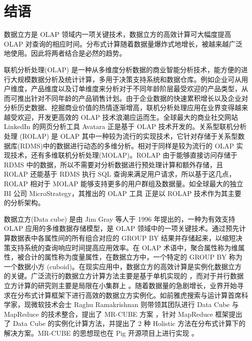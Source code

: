 
\chapter{结语}

数据立方是 OLAP 领域内一项关键技术，数据立方的高效计算可大幅度提高 OLAP 对查询的相应时间。分布式计算随着数据量爆炸式地增长，被越来越广泛地使用。因此将两者结合是必然的趋势。


联机分析处理(OLAP) \cite{chaudhuri1997overview} 是一种从多维度分析数据的商业智能分析技术，能方便的进行大规模数据分析及统计计算，多用于决策支持系统和数据仓库。例如企业可从用户维度，产品维度以及订单维度来分析对于不同年龄阶层最受欢迎的产品类型，从而可推出针对不同年龄的产品销售计划。由于企业数据的快速累积增长以及企业对分析历史数据、挖掘商业价值的热情逐渐增高，联机分析处理应用在业界变得越来越受欢迎，开发更高效的 OLAP 技术浪潮应运而生。全球最大的商业社交网站 LinkedIn 的网页分析工具 Avatara \cite{wu2012avatara} 正是基于 OLAP 技术开发的。关系型联机分析处理 (ROLAP) \cite{pedersen2001multidimensional}是 OLAP 其中一种较为流行的实现技术，它针对存储于关系型数据库(RDMS)中的数据进行动态的多维分析。相对于同样是较为流行的 OLAP 实现技术，还有多维联机分析处理(MOLAP)。ROLAP 由于能够直接访问存储于 RDMS 中的数据，所以不需要对分析数据进行预处理计算和额外存储，且 ROLAP 还能基于 RDMS 执行 SQL 查询来满足用户请求，所以基于这几点，ROLAP 相对于 MOLAP 能够支持更多的用户群组及数据量。如全球最大的独立 BI 公司 MicroStrategy，其推出的 OLAP 工具 \cite{msolapservice} 正是以 ROLAP 技术作为其主要的分析架构。

数据立方(Data cube) \cite{gray1997data}是由 Jim Gray 等人于 1996 年提出的，一种为有效支持 OLAP 应用的多维数据存储模型，是 OLAP 领域中的一项关键技术。通过预先计算数据表中各属性间的所有组合对应的 GROUP BY 结果并存储起来，以缩短决策支持系统的查询响应时间提高应用效率。在 OLAP 术语中，聚合属性称为维属性，被合计的属性称为度量属性，在数据立方中，一个特定的 GROUP BY 称为一个数据小方 (cuboid)。在现实应用中，数据立方的高效计算是实例化数据立方的关键。广泛流行的数据立方计算方法主要是基于单机实现的 \cite{agarwal1996computation} \cite{beyer1999bottom}，而对于并行数据立方计算的研究则主要是局限在小集群上 \cite{ng2001iceberg} \cite{dehne2002parallelizing}。随着数据量的急剧增长，业界开始寻求在分布式计算框架下进行高效的数据立方实例化。如前雅虎搜索与运计算首席科学家，现微软技术会士 Raghu Ramakrishnan 则带领其团队进行 Data Cube 与 MapReduce 的技术整合，提出了 MR-CUBE 方案 \cite{nandi2012data} \cite{nandi2011distributed}，针对 MapReduce 框架提出了 Data Cube 的实例化计算方法，并提出了 2 种 Holistic 方法在分布式计算下的解决方案。MR-CUBE 的思想现也在 Pig 开源项目上进行实现 \cite{mrcubepig}。



